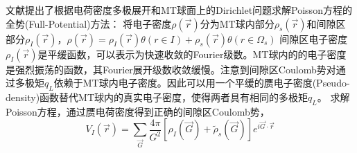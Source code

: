 文献\cite{JMP22-2433_1981}提出了根据电荷密度多极展开和MT球面上的Dirichlet问题求解Poisson方程的全势(Full-Potential)方法：
将电子密度$\rho(\vec r)$分为MT球内部分$\rho_s(\vec r)$和间隙区部分$\rho_I(\vec r)$，$\rho(\vec r)=\rho_I(\vec r)\theta(r\in I)+\rho_s(\vec r)\theta(r\in \Omega_s)$
间隙区电子密度$\rho_I(\vec r)$是平缓函数，可以表示为快速收敛的Fourier级数。MT球内的的电子密度是强烈振荡的函数，其Fourier展开级数收敛缓慢。注意到间隙区Coulomb势对通过多极矩$q_L$依赖于MT球内电子密度\cite{Landau-Lifshitz}。因此可以用一个平缓的赝电子密度(Pseudo-density)函数替代MT球内的真实电子密度，使得两者具有相同的多极矩$q_L$。%
求解Poisson方程，通过赝电荷密度得到正确的间隙区Coulomb势，
\begin{equation}
  V_I(\vec r)=\sum_{\vec G}\frac{4\pi}{G^2}[\rho_I(\vec G)+\tilde\rho_s(\vec G)]e^{i\vec G\cdot\vec r}
  \label{eq:solid-70}
\end{equation}

